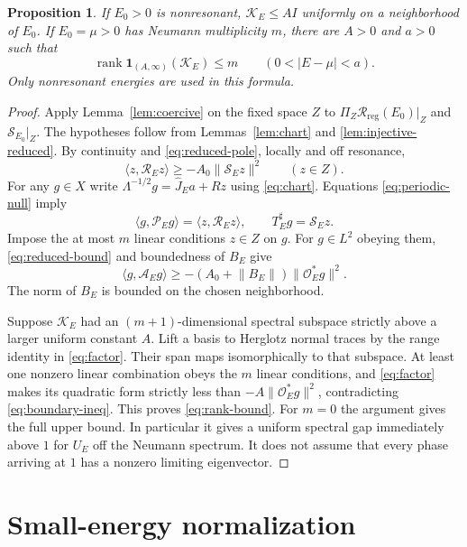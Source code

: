 \documentclass[11pt]{amsart}
\numberwithin{equation}{section}
\newtheorem{proposition}[lemma]{Proposition}
\newcommand{\OO}{\mathcal O}
\newcommand{\KK}{\mathcal K}
\newcommand{\Aop}{\mathcal A}
\newcommand{\PP}{\mathcal P}
\newcommand{\ip}[2]{\langle #1,#2\rangle}
\newcommand{\norm}[1]{\lVert #1\rVert}
\begin{document}
\begin{proposition}\label{prop:rank-bound}
If $E_0>0$ is nonresonant, $\KK_E\le A I$ uniformly on a neighborhood of
$E_0$. If $E_0=\mu>0$ has Neumann multiplicity $m$, there are $A>0$ and
$a>0$ such that
\begin{equation}\label{eq:rank-bound}
 \operatorname{rank}\mathbf1_{(A,\infty)}(\KK_E)\le m
 \qquad(0<|E-\mu|<a).
\end{equation}
Only nonresonant energies are used in this formula.
\end{proposition}
\begin{proof}
Apply Lemma~\ref{lem:coercive} on the fixed space $Z$ to
$\Pi_Z\mathscr R_{\mathrm{reg}}(E_0)|_Z$ and
$\mathscr S_{E_0}|_Z$. The hypotheses follow from
Lemmas~\ref{lem:chart} and \ref{lem:injective-reduced}. By continuity and
\eqref{eq:reduced-pole}, locally and off resonance,
\begin{equation}\label{eq:reduced-bound}
 \ip z{\mathscr R_Ez}\ge -A_0\norm{\mathscr S_Ez}^2\qquad(z\in Z).
\end{equation}
For any $g\in X$ write
$\Lambda^{-1/2}g=\widehat J_Ea+Rz$ using \eqref{eq:chart}.
Equations \eqref{eq:periodic-null} imply
\[
 \ip g{\PP_Eg}=\ip z{\mathscr R_Ez},\qquad
 T_E^\sharp g=\mathscr S_Ez.
\]
Impose the at most $m$ linear conditions $z\in Z$ on $g$.
For $g\in L^2$ obeying them, \eqref{eq:reduced-bound} and boundedness of
$B_E$ give
\begin{equation}\label{eq:boundary-ineq}
 \ip g{\Aop_Eg}\ge
 -(A_0+\norm{B_E})\norm{\OO_E^*g}^2.
\end{equation}
The norm of $B_E$ is bounded on the chosen neighborhood.

Suppose $\KK_E$ had an $(m+1)$-dimensional spectral subspace strictly
above a larger uniform constant $A$. Lift a basis to Herglotz normal
traces by the range identity in \eqref{eq:factor}. Their span
maps isomorphically to that subspace. At least one nonzero linear
combination obeys the $m$ linear conditions, and \eqref{eq:factor} makes
its quadratic form strictly less than $-A\norm{\OO_E^*g}^2$, contradicting
\eqref{eq:boundary-ineq}. This proves \eqref{eq:rank-bound}.
For $m=0$ the argument gives the full upper bound. In particular it gives
a uniform spectral gap immediately above $1$ for $U_E$ off the
Neumann spectrum. It does not assume that every phase arriving at $1$
has a nonzero limiting eigenvector.
\end{proof}

\section{Small-energy normalization}\label{sec:small}
\end{document}
